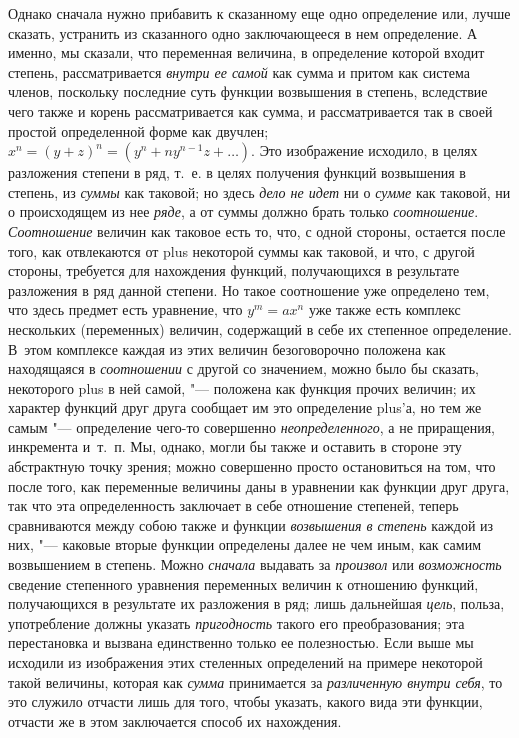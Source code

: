 Однако сначала нужно прибавить к сказанному еще одно определение или, лучше
сказать, устранить из сказанного одно заключающееся в нем определение. А
именно, мы сказали, что переменная величина, в определение которой входит
степень, рассматривается {\em внутри ее самой} как
сумма и притом как система членов, поскольку последние суть функции
возвышения в степень, вследствие чего также и корень рассматривается как
сумма, и рассматривается так в своей простой определенной форме как
двучлен; $x^n = (y + z)^n = (y^n + ny^{n-1}z + \dots)$. Это изображение
исходило, в целях разложения степени в ряд, т.~е. в целях получения функций
возвышения в степень, из {\em суммы} как таковой; но
здесь {\em дело не идет} ни о
{\em сумме} как таковой, ни о происходящем из нее
{\em ряде}, а от суммы должно брать только {\em соотношение}.
{\em Соотношение} величин как таковое есть то, что, с
одной стороны, остается после того, как отвлекаются от plus некоторой суммы
как таковой, и что, с другой стороны, требуется для нахождения функций,
получающихся в результате разложения в ряд данной степени. Но такое
соотношение уже определено тем, что здесь предмет есть уравнение, что
$y^m = ax^n$ уже также есть комплекс нескольких (переменных) величин,
содержащий в себе их степенное определение. В~этом комплексе каждая из этих
величин безоговорочно положена как находящаяся в
{\em соотношении} с другой со значением, можно было бы
сказать, некоторого plus в ней самой, "--- положена как функция прочих
величин; их характер функций друг друга сообщает им это определение plus'а,
но тем же самым "--- определение чего-то совершенно
{\em неопределенного}, а не приращения, инкремента
и~т.~п. Мы, однако, могли бы также и оставить в стороне эту абстрактную
точку зрения; можно совершенно просто остановиться на том, что после того,
как переменные величины даны в уравнении как функции друг друга, так что
эта определенность заключает в себе отношение степеней, теперь сравниваются
между собою также и функции {\em возвышения в степень}
каждой из них, "--- каковые вторые функции определены далее не чем иным, как
самим возвышением в степень. Можно {\em сначала}
выдавать за {\em произвол} или
{\em возможность} сведение степенного уравнения
переменных величин к отношению функций, получающихся в результате их
разложения в ряд; лишь дальнейшая {\em цель}, польза,
употребление должны указать {\em пригодность} такого
его преобразования; эта перестановка и вызвана единственно только ее
полезностью. Если выше мы исходили из изображения этих стеленных
определений на примере некоторой такой величины, которая как
{\em сумма} принимается за
{\em различенную внутри себя}, то это служило отчасти
лишь для того, чтобы указать, какого вида эти функции, отчасти же в этом
заключается способ их нахождения.

